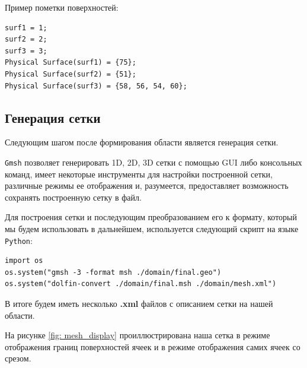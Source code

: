 \documentclass[a4paper, 14pt]{extreport}
\begin{document}
Пример пометки поверхностей:
\begin{lstlisting}
surf1 = 1;
surf2 = 2;
surf3 = 3;
Physical Surface(surf1) = {75};
Physical Surface(surf2) = {51};
Physical Surface(surf3) = {58, 56, 54, 60};
\end{lstlisting}

\subsection{Генерация сетки}

Следующим шагом после формирования области является генерация сетки.

\texttt{Gmsh} позволяет генерировать 1D, 2D, 3D сетки с помощью 
GUI либо консольных команд, имеет некоторые инструменты
для настройки построенной сетки, различные режимы ее отображения
и, разумеется, предоставляет возможность сохранять построенную сетку в файл.

Для построения сетки и последующим преобразованием его к 
формату, который 
мы будем использовать в дальнейшем, используется следующий  
скрипт на языке \texttt{Python}:

\begin{lstlisting}
import os
os.system("gmsh -3 -format msh ./domain/final.geo")
os.system("dolfin-convert ./domain/final.msh ./domain/mesh.xml")
\end{lstlisting}

В итоге будем иметь несколько \textbf{.xml} файлов с описанием
сетки на нашей области.

На рисунке \ref{fig: mesh_display}
проиллюстрирована наша сетка в режиме отображения границ
поверхностей ячеек и в режиме отображения самих ячеек со срезом.
\end{document}
